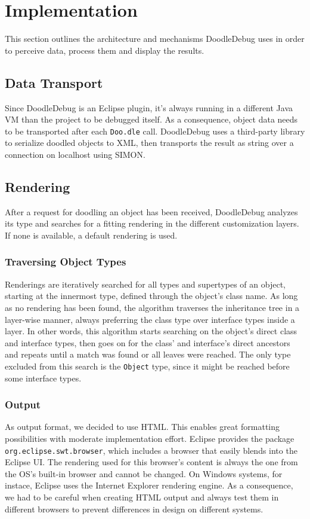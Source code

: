 \documentclass[english]{scrartcl}
\newcommand{\DD}{Dood\-le\-De\-bug\xspace}
\newcommand{\Doodle}{\texttt{Doo.\-dle}\xspace}
\begin{document}
\section{Implementation}
This section outlines the architecture and mechanisms \DD uses in order to perceive data, process them and display the results.

\subsection{Data Transport}
Since \DD is an Eclipse plugin, it's always running in a different Java VM than the project to be debugged itself.
As a consequence, object data needs to be transported after each \Doodle call.
\DD uses a third-party library\cite{xstream} to serialize doodled objects to XML, then transports the result as string over a connection on localhost using SIMON\cite{simon}.

\subsection{Rendering}
After a request for doodling an object has been received, \DD analyzes its type and searches for a fitting rendering in the different customization layers.
If none is available, a default rendering is used.

\subsubsection{Traversing Object Types}
Renderings are iteratively searched for all types and supertypes of an object, starting at the innermost type, defined through the object's class name.
As long as no rendering has been found, the algorithm traverses the inheritance tree in a layer-wise manner, always preferring the class type over interface types inside a layer.
In other words, this algorithm starts searching on the object's direct class and interface types, then goes on for the class' and interface's direct ancestors and repeats until a match was found or all leaves were reached.
The only type excluded from this search is the \texttt{Object} type, since it might be reached before some interface types.

\subsubsection{Output}
As output format, we decided to use HTML.
This enables great formatting possibilities with moderate implementation effort.
Eclipse provides the package \texttt{org.eclipse.swt.browser}, which includes a browser that easily blends into the Eclipse UI.
The rendering used for this browser's content is always the one from the OS's built-in browser and cannot be changed.
On Windows systems, for instace, Eclipse uses the Internet Explorer rendering engine.
As a consequence, we had to be careful when creating HTML output and always test them in different browsers to prevent differences in design on different systems.
\end{document}
